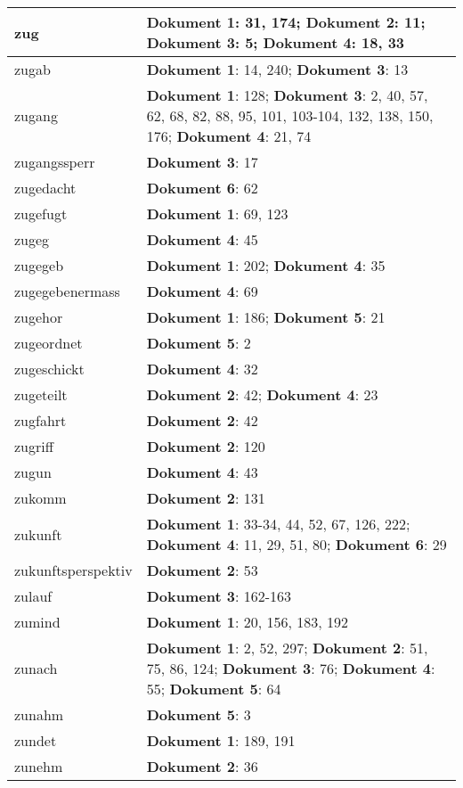 \documentclass[a5paper]{article}
\begin{document}
\begin{longtable}[l]{|l|p{3in}|}
\hline
zug & \textbf{Dokument 1}: 31, 174; \textbf{Dokument 2}: 11; \textbf{Dokument 3}: 5; \textbf{Dokument 4}: 18, 33 \\
\hline
zugab & \textbf{Dokument 1}: 14, 240; \textbf{Dokument 3}: 13 \\
\hline
zugang & \textbf{Dokument 1}: 128; \textbf{Dokument 3}: 2, 40, 57, 62, 68, 82, 88, 95, 101, 103-104, 132, 138, 150, 176; \textbf{Dokument 4}: 21, 74 \\
\hline
zugangssperr & \textbf{Dokument 3}: 17 \\
\hline
zugedacht & \textbf{Dokument 6}: 62 \\
\hline
zugefugt & \textbf{Dokument 1}: 69, 123 \\
\hline
zugeg & \textbf{Dokument 4}: 45 \\
\hline
zugegeb & \textbf{Dokument 1}: 202; \textbf{Dokument 4}: 35 \\
\hline
zugegebenermass & \textbf{Dokument 4}: 69 \\
\hline
zugehor & \textbf{Dokument 1}: 186; \textbf{Dokument 5}: 21 \\
\hline
zugeordnet & \textbf{Dokument 5}: 2 \\
\hline
zugeschickt & \textbf{Dokument 4}: 32 \\
\hline
zugeteilt & \textbf{Dokument 2}: 42; \textbf{Dokument 4}: 23 \\
\hline
zugfahrt & \textbf{Dokument 2}: 42 \\
\hline
zugriff & \textbf{Dokument 2}: 120 \\
\hline
zugun & \textbf{Dokument 4}: 43 \\
\hline
zukomm & \textbf{Dokument 2}: 131 \\
\hline
zukunft & \textbf{Dokument 1}: 33-34, 44, 52, 67, 126, 222; \textbf{Dokument 4}: 11, 29, 51, 80; \textbf{Dokument 6}: 29 \\
\hline
zukunftsperspektiv & \textbf{Dokument 2}: 53 \\
\hline
zulauf & \textbf{Dokument 3}: 162-163 \\
\hline
zumind & \textbf{Dokument 1}: 20, 156, 183, 192 \\
\hline
zunach & \textbf{Dokument 1}: 2, 52, 297; \textbf{Dokument 2}: 51, 75, 86, 124; \textbf{Dokument 3}: 76; \textbf{Dokument 4}: 55; \textbf{Dokument 5}: 64 \\
\hline
zunahm & \textbf{Dokument 5}: 3 \\
\hline
zundet & \textbf{Dokument 1}: 189, 191 \\
\hline
zunehm & \textbf{Dokument 2}: 36 \\

\end{longtable}
\end{document}
